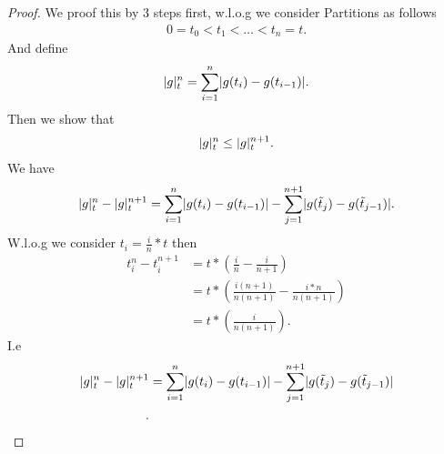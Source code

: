 \begin{proof}
  We proof this by 3 steps first, w.l.o.g we consider Partitions as follows
 \begin{align*}
 0 = t_{0}<t_{1}<\ldots <t_n = t 
 .\end{align*}
 And define 
 \begin{align*}
   \lvert g\rvert_t^n =  \sum_{i=1}^{n} \lvert g(t_i)-g(t_{i-1})\rvert 
 .\end{align*}
 Then we show that 
 \begin{align*}
   \lvert g\rvert_t^n \le  \lvert g\rvert_t^{n+1} 
 .\end{align*}
We have
\begin{align*}
  \lvert g\rvert_t^n - \lvert g\rvert_t^{n+1}   = \sum_{i=1}^{n} \lvert g(t_i)-g(t_{i-1})\rvert  - \sum_{j=1}^{n+1} \lvert g(\tilde{t}_j)-g(\tilde{t}_{j-1})\rvert
.\end{align*}
W.l.o.g we consider $t_i = \frac{i}{n}*t$ then 
\begin{align*}
  t_i^{n}  -t_i^{n+1} &= t*(\frac{i}{n} - \frac{i}{n+1})\\
                      &= t* (\frac{i(n+1)}{n(n+1)} -\frac{i*n}{n(n+1)})\\
                      &= t*(\frac{i}{n(n+1)})
.\end{align*}
I.e 
\begin{align*}
  \lvert g\rvert_t^n - \lvert g\rvert_t^{n+1}   &= \sum_{i=1}^{n} \lvert g(t_i)-g(t_{i-1})\rvert  - \sum_{j=1}^{n+1} \lvert g(\tilde{t}_j)-g(\tilde{t}_{j-1})\rvert\\
.\end{align*}
\end{proof}
